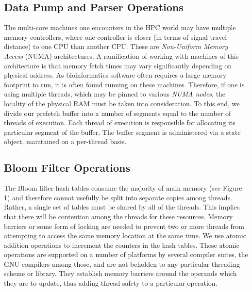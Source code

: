 \documentclass{article}
\begin{document}
\subsection{Data Pump and Parser Operations}

The multi-core machines one encounters in the HPC world may have multiple
memory controllers, where one controller is closer (in terms of signal travel
distance) to one CPU than another CPU. These are \textit{Non-Uniform Memory
Access} (NUMA) architectures. A ramification of working with machines of this
architecture is that memory fetch times may vary significantly depending on
physical address. As bioinformatics software often requires a large memory
footprint to run, it is often found running on these machines. Therefore, if
one is using multiple threads, which may be pinned to various \textit{NUMA
nodes}, the locality of the physical RAM must be taken into consideration. To
this end, we divide our prefetch buffer into a number of segments equal to the
number of threads of execution. Each thread of execution is responsible for
allocating its particular segment of the buffer. The buffer segment is
administered via a state object, maintained on a per-thread basis.

\subsection{Bloom Filter Operations}

The Bloom filter hash tables consume the majority of main memory (see Figure 1) and therefore cannot usefully be split into separate copies among
threads. Rather, a single set of tables must be shared by all of the threads.
This implies that there will be contention among the threads for these
resources. Memory barriers \citep{web:membar} or some form of locking are
needed to prevent two or more threads from attempting to access the same memory
location at the same time. We use atomic addition operations to increment the
counters in the hash tables. These atomic operations \citep{web:atomics} are
supported on a number of platforms by several compiler suites, the GNU
compilers among those, and are not beholden to any particular threading scheme
or library. They establish memory barriers around the operands which they are
to update, thus adding thread-safety to a particular operation.
\end{document}
